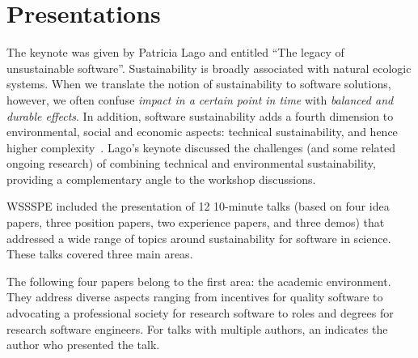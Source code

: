 \documentclass[11pt, oneside]{amsart}
\newcommand{\note}[1]{ {\textcolor{blueish}    { ***Note:      #1 }}}
\begin{document}
\section{Presentations}\label{sec:presentations}


The keynote was given by Patricia Lago and entitled ``The legacy of unsustainable software''.
%
Sustainability is broadly associated with natural ecologic systems. When we translate the notion of sustainability to software solutions, however, we often confuse {\em impact in a certain point in time} with {\em balanced and durable effects}. In addition, software sustainability adds a fourth dimension to environmental, social and economic aspects: technical sustainability, and hence higher complexity~\cite{Lago2015}.  Lago's keynote discussed the challenges (and some related ongoing research) of combining technical and environmental sustainability, providing a complementary angle to the workshop discussions. 



WSSSPE included the presentation of 12 10-minute talks (based on four idea papers, three position papers,
two experience papers, and three demos) that addressed a wide range of topics around
sustainability for software in science. These talks covered three main areas.

The following four papers belong to the first area: the academic environment.
They address diverse aspects ranging from incentives for quality software to
advocating a professional society for research software to roles and degrees for
research software engineers. For talks with multiple authors, an
\textsuperscript{\textasteriskcentered} indicates the author who presented the talk.
\end{document}
